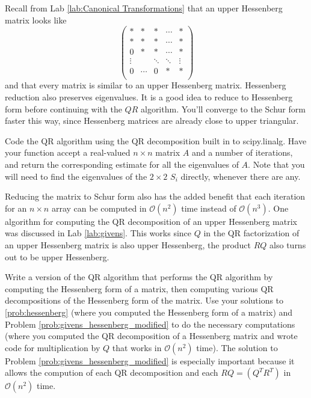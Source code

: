 Recall from Lab \ref{lab:Canonical Transformations} that an upper Hessenberg matrix looks like
\[
\begin{pmatrix}
* & * & * & \cdots & * \\
* & * & * & \cdots & * \\
0 & * & * & \cdots&* \\
\vdots & & \ddots & \ddots & \vdots \\
0 & \cdots & 0 & * & *\\
\end{pmatrix}
\]
and that every matrix is similar to an upper Hessenberg matrix.
Hessenberg reduction also preserves eigenvalues.
It is a good idea to reduce to Hessenberg form before continuing with the $QR$ algorithm.
You'll converge to the Schur form faster this way, since Hessenberg matrices are already close to upper triangular.

\begin{problem}
Code the QR algorithm using the QR decomposition built in to scipy.linalg.
Have your function accept a real-valued $n \times n$ matrix $A$ and a number of iterations, and return the corresponding estimate for all the eigenvalues of $A$.
Note that you will need to find the eigenvalues of the $2 \times 2$ $S_i$ directly, whenever there are any.
\end{problem}

Reducing the matrix to Schur form also has the added benefit that each iteration for an $n \times n$ array can be computed in $\mathcal{O} \left( n^2 \right)$ time instead of $\mathcal{O} \left( n^3 \right)$.
One algorithm for computing the QR decomposition of an upper Hessenberg matrix was discussed in Lab \ref{lab:givens}.
This works since $Q$ in the QR factorization of an upper Hessenberg matrix is also upper Hessenberg, the product $R Q$ also turns out to be upper Hessenberg.

\begin{problem}
\label{prob:QR_eig_hessenberg}
Write a version of the QR algorithm that performs the QR algorithm by computing the Hessenberg form of a matrix, then computing various QR decompositions of the Hessenberg form of the matrix.
Use your solutions to \ref{prob:hessenberg} (where you computed the Hessenberg form of a matrix) and Problem \ref{prob:givens_hessenberg_modified} to do the necessary computations (where you computed the QR decomposition of a Hessenberg matrix and wrote code for multiplication by $Q$ that works in $\mathcal{O} \left( n^2 \right)$ time).
The solution to Problem \ref{prob:givens_hessenberg_modified} is especially important because it allows the compution of each QR decomposition and each $R Q = \left( Q^T R^T \right)$ in $\mathcal{O} \left( n^2 \right)$ time.
\end{problem}

